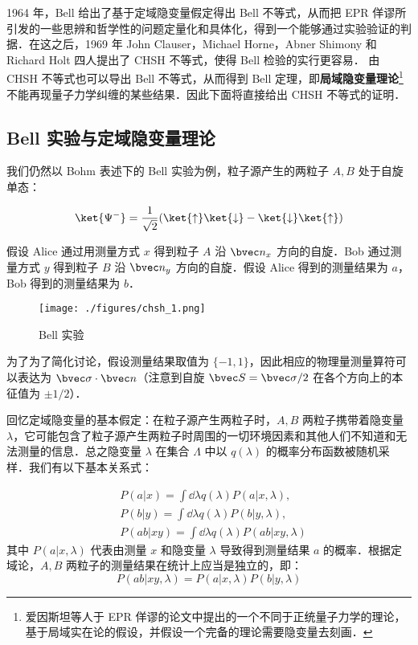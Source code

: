 

1964 年，Bell 给出了基于定域隐变量假定得出 Bell 不等式，从而把 EPR 佯谬所引发的一些思辨和哲学性的问题定量化和具体化，得到一个能够通过实验验证的判据．在这之后，1969 年 John Clauser，Michael Horne，Abner Shimony 和 Richard Holt 四人提出了 CHSH 不等式，使得 Bell 检验的实行更容易． 由 CHSH 不等式也可以导出 Bell 不等式，从而得到 Bell 定理，即\textbf{局域隐变量理论}\footnote{爱因斯坦等人于 EPR 佯谬的论文中提出的一个不同于正统量子力学的理论，基于局域实在论的假设，并假设一个完备的理论需要隐变量去刻画．}不能再现量子力学纠缠的某些结果．因此下面将直接给出 CHSH 不等式的证明．

\subsection{Bell 实验与定域隐变量理论}
我们仍然以 Bohm 表述下的 Bell 实验为例，粒子源产生的两粒子 $A,B$ 处于自旋单态：

\begin{equation}
\ket{\Psi^-}=\frac{1}{\sqrt{2}}(\ket{\uparrow}\ket{\downarrow}-\ket{\downarrow}\ket{\uparrow})
\end{equation}

假设 Alice 通过用测量方式 $x$ 得到粒子 $A$ 沿 $\bvec n_x$ 方向的自旋．Bob 通过测量方式 $y$ 得到粒子 $B$ 沿 $\bvec n_y$ 方向的自旋．假设 Alice 得到的测量结果为 $a$，Bob 得到的测量结果为 $b$．

\begin{figure}[ht]
\centering
\texttt{[image: ./figures/chsh\_1.png]}
\caption{Bell 实验} \label{chsh_fig1}
\end{figure}

为了为了简化讨论，假设测量结果取值为 $\{-1,1\}$，因此相应的物理量测量算符可以表达为 $\bvec \sigma \cdot \bvec n$（注意到自旋 $\bvec S=\bvec \sigma/2$ 在各个方向上的本征值为 $\pm 1/2$）．

回忆定域隐变量的基本假定：在粒子源产生两粒子时，$A,B$ 两粒子携带着隐变量 $\lambda$，它可能包含了粒子源产生两粒子时周围的一切环境因素和其他人们不知道和无法测量的信息．总之隐变量 $\lambda$ 在集合 $\Lambda$ 中以 $q(\lambda)$ 的概率分布函数被随机采样．我们有以下基本关系式：

\begin{equation}
\begin{aligned}
&P(a|x)=\int \dd \lambda q(\lambda)P(a|x,\lambda),\\
&P(b|y)=\int \dd \lambda q(\lambda)P(b|y,\lambda),\\
&P(ab|xy)=\int \dd \lambda q(\lambda)P(ab|xy,\lambda)
\end{aligned}
\end{equation}
其中 $P(a|x,\lambda)$ 代表由测量 $x$ 和隐变量 $\lambda$ 导致得到测量结果 $a$ 的概率．根据定域论，$A,B$ 两粒子的测量结果在统计上应当是独立的，即：
\begin{equation}
P(ab|xy,\lambda)=P(a|x,\lambda)P(b|y,\lambda)
\end{equation}
